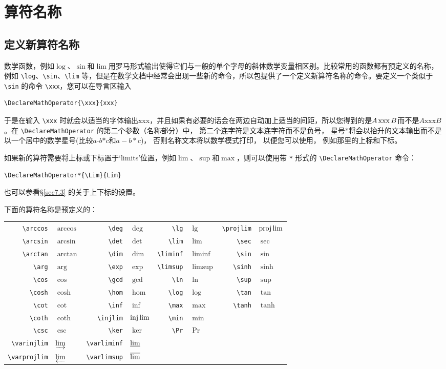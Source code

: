 
\chapter{算符名称}
\section{定义新算符名称}
数学函数，例如$\log$、$\sin$和$\lim$用罗马形式输出使得它们与一般的单个字母的斜体数学变量相区别。比较常用的函数都有预定义的名称，例如 \verb|\log|、\verb|\sin|、\verb|\lim| 等，但是在数学文档中经常会出现一些新的命令，所以包提供了一个定义新算符名称的命令。要定义一个类似于 \verb|\sin| 的命令 \verb|\xxx|，您可以在导言区输入
\begin{verbatim}
\DeclareMathOperator{\xxx}{xxx}
\end{verbatim}

于是在输入 \verb|\xxx| 时就会以适当的字体输出xxx，并且如果有必要的话会在两边自动加上适当的间距，所以您得到的是$A\xxx B$而不是$A\text{xxx}B$。在 \verb|\DeclareMathOperator| 的第二个参数（名称部分）中，  第二个连字符是文本连字符而不是负号，  星号*将会以抬升的文本输出而不是以一个居中的数学星号(比较$a\text{-}b\text{*}c$和$a-b*c$)，  否则名称文本将以数学模式打印，  以便您可以使用，  例如那里的上标和下标。

如果新的算符需要将上标或下标置于‘limits’位置，例如$\lim$、$\sup$和$\max$，则可以使用带 \verb+*+ 形式的 \verb|\DeclareMathOperator| 命令：
\begin{verbatim}
\DeclareMathOperator*{\Lim}{Lim}
\end{verbatim}
也可以参看\S \ref{sec7.3} 的关于上下标的设置。

下面的算符名称是预定义的：

\begin{center}
\begin{tabular}{rlrlrlrl}
\verb|\arccos|&$\arccos$&\verb|\deg|&$\deg$&\verb|\lg|&$\lg$&\verb|\projlim|&$\projlim$\\
\verb|\arcsin|&$\arcsin$&\verb|\det|&$\det$&\verb|\lim|&$\lim$&\verb|\sec|&$\sec$\\
\verb|\arctan|&$\arctan$&\verb|\dim|&$\dim$&\verb|\liminf|&$\liminf$&\verb|\sin|&$\sin$\\
\verb|\arg|&$\arg$&\verb|\exp|&$\exp$&\verb|\limsup|&$\limsup$&\verb|\sinh|&$\sinh$\\
\verb|\cos|&$\cos$&\verb|\gcd|&$\gcd$&\verb|\ln|&$\ln$&\verb|\sup|&$\sup$\\
\verb|\cosh|&$\cosh$&\verb|\hom|&$\hom$&\verb|\log|&$\log$&\verb|\tan|&$\tan$\\
\verb|\cot|&$\cot$&\verb|\inf|&$\inf$&\verb|\max|&$\max$&\verb|\tanh|&$\tanh$\\
\verb|\coth|&$\coth$&\verb|\injlim|&$\injlim$&\verb|\min|&$\min$&&\\
\verb|\csc|&$\csc$&\verb|\ker|&$\ker$&\verb|\Pr|&$\Pr$&&\\
\verb|\varinjlim|&$\varinjlim$&\verb|\varliminf|&$\varliminf$&&&&\\
\verb|\varprojlim|&$\varprojlim$&\verb|\varlimsup|&$\varlimsup$&&&&
\end{tabular}
\end{center}

